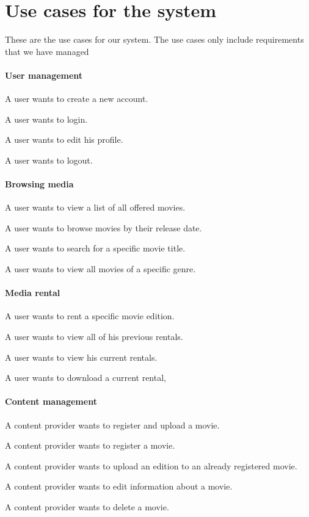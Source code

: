 \section{Use cases for the system}
\label{Requirements_UC}
These are the use cases for our system. The use cases only include requirements that we have managed
\paragraph{User management}
\begin{my_itemize}
	\item A user wants to create a new account.
	\item A user wants to login.
	\item A user wants to edit his profile.
	\item A user wants to logout.
\end{my_itemize}

\paragraph{Browsing media}
\begin{my_itemize}
	\item A user wants to view a list of all offered movies.
	\item A user wants to browse movies by their release date.
	\item A user wants to search for a specific movie title.
	\item A user wants to view all movies of a specific genre.
\end{my_itemize}

\paragraph{Media rental}
\begin{my_itemize}
	\item A user wants to rent a specific movie edition.
	\item A user wants to view all of his previous rentals.
	\item A user wants to view his current rentals.
	\item A user wants to download a current rental,
\end{my_itemize}

\paragraph{Content management}
\begin{my_itemize}
	\item A content provider wants to register and upload a movie.
	\item A content provider wants to register a movie.
	\item A content provider wants to upload an edition to an already registered movie.
	\item A content provider wants to edit information about a movie.
	\item A content provider wants to delete a movie.
\end{my_itemize}